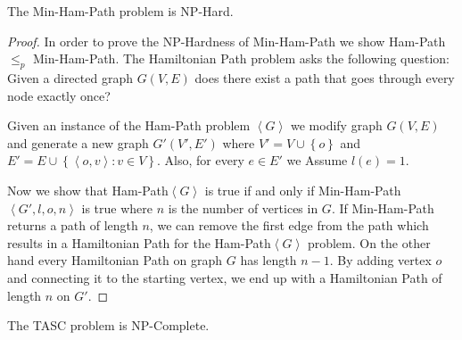 \begin{theorem}
\label{th:MinHam}
The Min-Ham-Path problem is NP-Hard.
\end{theorem}

\begin{proof}
In order to prove the NP-Hardness of Min-Ham-Path we show Ham-Path $\leq_p$ Min-Ham-Path. The Hamiltonian Path problem asks the following question: Given a directed graph $G(V,E)$ does there exist a path that goes through every node exactly once?

Given an instance of the Ham-Path problem $\left\langle G \right\rangle$ we modify graph $G(V,E)$ and generate a new graph $G'(V', E')$ where $V' = V \cup \left\{ o \right\}$ and $E' = E \cup \left\{ \left\langle o, v \right\rangle : v \in V \right\}$. Also, for every $e \in E'$ we Assume $l(e) = 1$.

Now we show that Ham-Path$\left\langle G \right\rangle$ is true if and only if Min-Ham-Path$\left\langle G', l, o, n \right\rangle$ is true where $n$ is the number of vertices in $G$. If Min-Ham-Path returns a path of length $n$, we can remove the first edge from the path which results in a Hamiltonian Path for the Ham-Path$\left\langle G \right\rangle$ problem. On the other hand every Hamiltonian Path on graph $G$ has length $n-1$. By adding vertex $o$ and connecting it to the starting vertex, we end up with a Hamiltonian Path of length $n$ on $G'$.
\end{proof}

\begin{theorem}
\label{th:TASC}
The TASC problem is NP-Complete.
\end{theorem}

